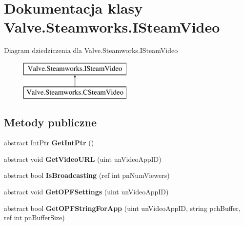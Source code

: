 \hypertarget{class_valve_1_1_steamworks_1_1_i_steam_video}{}\section{Dokumentacja klasy Valve.\+Steamworks.\+I\+Steam\+Video}
\label{class_valve_1_1_steamworks_1_1_i_steam_video}
Diagram dziedziczenia dla Valve.\+Steamworks.\+I\+Steam\+Video\begin{figure}[H]
\begin{center}
\leavevmode
\includegraphics[height=2.000000cm]{class_valve_1_1_steamworks_1_1_i_steam_video}
\end{center}
\end{figure}
\subsection*{Metody publiczne}
\begin{DoxyCompactItemize}
\item 
\mbox{\label{class_valve_1_1_steamworks_1_1_i_steam_video_af6eb196b10aaf5f8460483861b18fd01}} 
abstract Int\+Ptr {\bfseries Get\+Int\+Ptr} ()
\item 
\mbox{\label{class_valve_1_1_steamworks_1_1_i_steam_video_a44b654ff9d6abca60ef55cb5022117e9}} 
abstract void {\bfseries Get\+Video\+U\+RL} (uint un\+Video\+App\+ID)
\item 
\mbox{\label{class_valve_1_1_steamworks_1_1_i_steam_video_a78f25ab7a179ccde37294aa7b14ddad1}} 
abstract bool {\bfseries Is\+Broadcasting} (ref int pn\+Num\+Viewers)
\item 
\mbox{\label{class_valve_1_1_steamworks_1_1_i_steam_video_a7dfd76d16a467f2c5d02d4dbeeb6d32d}} 
abstract void {\bfseries Get\+O\+P\+F\+Settings} (uint un\+Video\+App\+ID)
\item 
\mbox{\label{class_valve_1_1_steamworks_1_1_i_steam_video_a1fd53303ec3683db42d320a7d0c40b92}} 
abstract bool {\bfseries Get\+O\+P\+F\+String\+For\+App} (uint un\+Video\+App\+ID, string pch\+Buffer, ref int pn\+Buffer\+Size)
\end{DoxyCompactItemize}


